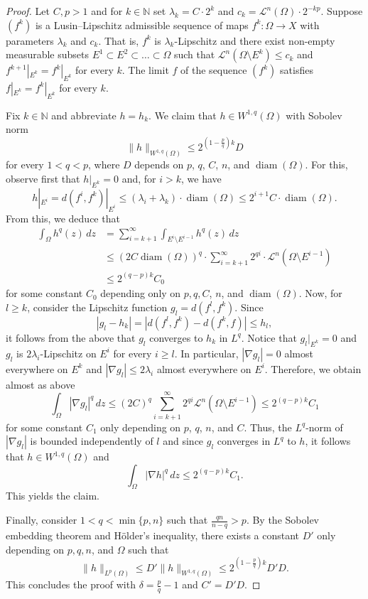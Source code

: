 \documentclass[a4paper,leqno]{amsart}
\numberwithin{equation}{section}
\theoremstyle{remark}
\theoremstyle{remark}
\newcommand{\N}{\mathbb{N}}
\newcommand{\lm}{\mathscr{L}}
\DeclareMathOperator{\diam}{diam}
\begin{document}
\begin{proof}
 Let $C, p>1$ and for $k\in\N$ set $\lambda_k= C\cdot 2^k$ and $c_k= \lm^{n}(\Omega)\cdot 2^{-kp}$. Suppose $(f^k)$ is a Lusin--Lipschitz admissible sequence of maps $f^k\colon\Omega\to X$ with parameters $\lambda_k$ and $c_k$. That is, $f^k$ is $\lambda_k$-Lipschitz and there exist non-empty measurable subsets $E^1\subset E^2\subset\dots \subset \Omega$ such that $\lm^n(\Omega\setminus E^k)\leq c_k$ and $f^{k+1}|_{E^k} = f^k|_{E^k}$ for every $k$. The limit $f$ of the sequence $(f^k)$ satisfies $f|_{E^k} = f^k|_{E^k}$ for every $k$.
 
 Fix $k\in\N$ and abbreviate $h=h_k$. We claim that $h\in W^{1,q}(\Omega)$ with Sobolev norm $$\|h\|_{W^{1,q}(\Omega)}\leq 2^{\left(1-\frac{p}{q}\right)k}D$$ for every $1<q<p$, where $D$ depends on $p$, $q$, $C$, $n$, and $\diam(\Omega)$.  For this, observe first that $h|_{E^k}=0$ and, for $i> k$, we have $$h|_{E^i} = d(f^i, f^k)|_{E^i}\leq (\lambda_i + \lambda_k)\cdot\diam(\Omega)\leq 2^{i+1}C\cdot\diam(\Omega).$$
From this, we deduce that 
\begin{equation*}
    \begin{split}
        \int_\Omega h^q(z)\,dz &= \sum_{i=k+1}^\infty \int_{E^i\setminus E^{i-1}}h^q(z)\,dz\\
        &\leq (2C\diam(\Omega))^q\cdot \sum_{i=k+1}^\infty 2^{qi}\cdot \lm^n(\Omega\setminus E^{i-1})\\
 &\leq 2^{(q-p)k} C_0
    \end{split}
\end{equation*}
for some constant $C_0$ depending only on $p, q, C$, $n$, and $\diam(\Omega)$. Now, for $l\geq k$, consider the Lipschitz function $g_l=d(f^l,f^k)$. Since $$|g_l-h_k| = |d(f^l, f^k) - d(f^k, f)| \leq h_l,$$ it follows from the above that $g_l$ converges to $h_k$ in $L^q$. Notice that $g_l|_{E^k}=0$ and $g_l$ is $2\lambda_i$-Lipschitz on $E^i$ for every $i\geq l$. In particular, $|\nabla g_l|=0$ almost everywhere on $E^k$ and $|\nabla g_l|\leq 2\lambda_i$ almost everywhere on $E^i$. Therefore, we obtain almost as above
\begin{equation*}
      \int_\Omega |\nabla g_l|^q\,dz \leq (2C)^q \sum_{i=k+1}^\infty 2^{qi}\lm^n(\Omega\setminus E^{i-1}) \leq 2^{(q-p)k}C_1
\end{equation*}
for some constant $C_1$ only depending on $p$, $q$, $n$, and $C$. Thus, the $L^q$-norm of $|\nabla g_l|$ is bounded independently of $l$ and since $g_l$ converges in $L^q$ to $h$, it follows that $h\in W^{1,q}(\Omega)$ and $$\int_\Omega |\nabla h|^q\,dz\leq 2^{(q-p)k}C_1.$$ This yields the claim.

    Finally, consider $1<q<\min\{p, n\}$ such that $\frac{qn}{n-q}>p$. By the Sobolev embedding theorem and H\"older's inequality, there exists a constant $D'$ only depending on $p, q, n$, and $\Omega$ such that $$\|h\|_{L^p(\Omega)} \leq D' \|h\|_{W^{1,q}(\Omega)}\leq 2^{\left(1-\frac{p}{q}\right)k}D'D.$$ This concludes the proof with $\delta = \frac{p}{q} - 1$ and $C'= D' D$.
\end{proof}
\end{document}

